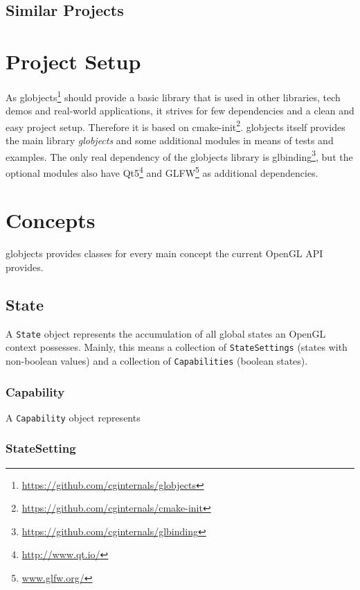 \documentclass{article}
\begin{document}
\subsection{Similar Projects}

\section{Project Setup}

As globjects\footnote{\url{https://github.com/cginternals/globjects}} should provide a basic library that is used in other libraries, tech demos and real-world applications, it strives for few dependencies and a clean and easy project setup.
Therefore it is based on cmake-init\footnote{\url{https://github.com/cginternals/cmake-init}}.
globjects itself provides the main library \emph{globjects} and some additional modules in means of tests and examples. The only real dependency of the globjects library is glbinding\footnote{\url{https://github.com/cginternals/glbinding}}, but the optional modules also have Qt5\footnote{\url{http://www.qt.io/}} and GLFW\footnote{\url{www.glfw.org/}} as additional dependencies.

\section{Concepts}

globjects provides classes for every main concept the current OpenGL API provides.

\subsection{State}

A \verb|State| object represents the accumulation of all global states an OpenGL context possesses. Mainly, this means a collection of \verb|StateSettings| (states with non-boolean values) and a collection of \verb|Capabilities| (boolean states).

\subsubsection{Capability}

A \verb|Capability| object represents 

\subsubsection{StateSetting}
\end{document}
